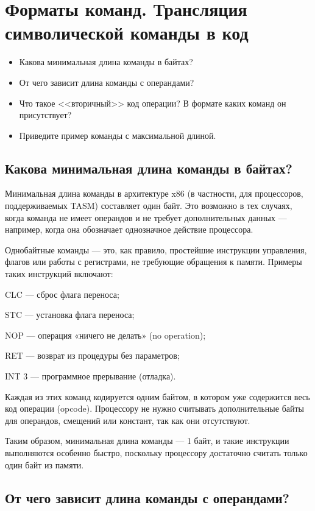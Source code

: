 \chapter{Форматы команд. Трансляция символической команды в код}
\begin{itemize}
\item Какова минимальная длина команды в байтах?
\item От чего зависит длина команды с операндами?
\item Что такое <<вторичный>> код операции? В формате каких команд он присутствует?
\item Приведите пример команды с максимальной длиной.
\end{itemize}

\section{Какова минимальная длина команды в байтах?}

Минимальная длина команды в архитектуре x86 (в частности, для процессоров, поддерживаемых TASM) составляет один байт. Это возможно в тех случаях, когда команда не имеет операндов и не требует дополнительных данных — например, когда она обозначает однозначное действие процессора.

Однобайтные команды — это, как правило, простейшие инструкции управления, флагов или работы с регистрами, не требующие обращения к памяти. Примеры таких инструкций включают:

CLC — сброс флага переноса;

STC — установка флага переноса;

NOP — операция «ничего не делать» (no operation);

RET — возврат из процедуры без параметров;

INT 3 — программное прерывание (отладка).

Каждая из этих команд кодируется одним байтом, в котором уже содержится весь код операции (opcode). Процессору не нужно считывать дополнительные байты для операндов, смещений или констант, так как они отсутствуют.

Таким образом, минимальная длина команды — 1 байт, и такие инструкции выполняются особенно быстро, поскольку процессору достаточно считать только один байт из памяти.

\section{От чего зависит длина команды с операндами?}

